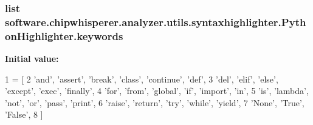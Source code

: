 \subsubsection[{keywords}]{\setlength{\rightskip}{0pt plus 5cm}list software.\+chipwhisperer.\+analyzer.\+utils.\+syntaxhighlighter.\+Python\+Highlighter.\+keywords\hspace{0.3cm}{\ttfamily [static]}}\label{classsoftware_1_1chipwhisperer_1_1analyzer_1_1utils_1_1syntaxhighlighter_1_1PythonHighlighter_ad5fa814a6a65820676451524e140fdcd}
{\bfseries Initial value\+:}
\begin{DoxyCode}
1 = [
2         \textcolor{stringliteral}{'and'}, \textcolor{stringliteral}{'assert'}, \textcolor{stringliteral}{'break'}, \textcolor{stringliteral}{'class'}, \textcolor{stringliteral}{'continue'}, \textcolor{stringliteral}{'def'},
3         \textcolor{stringliteral}{'del'}, \textcolor{stringliteral}{'elif'}, \textcolor{stringliteral}{'else'}, \textcolor{stringliteral}{'except'}, \textcolor{stringliteral}{'exec'}, \textcolor{stringliteral}{'finally'},
4         \textcolor{stringliteral}{'for'}, \textcolor{stringliteral}{'from'}, \textcolor{stringliteral}{'global'}, \textcolor{stringliteral}{'if'}, \textcolor{stringliteral}{'import'}, \textcolor{stringliteral}{'in'},
5         \textcolor{stringliteral}{'is'}, \textcolor{stringliteral}{'lambda'}, \textcolor{stringliteral}{'not'}, \textcolor{stringliteral}{'or'}, \textcolor{stringliteral}{'pass'}, \textcolor{stringliteral}{'print'},
6         \textcolor{stringliteral}{'raise'}, \textcolor{stringliteral}{'return'}, \textcolor{stringliteral}{'try'}, \textcolor{stringliteral}{'while'}, \textcolor{stringliteral}{'yield'},
7         \textcolor{stringliteral}{'None'}, \textcolor{stringliteral}{'True'}, \textcolor{stringliteral}{'False'},
8     ]
\end{DoxyCode}
\hypertarget{classsoftware_1_1chipwhisperer_1_1analyzer_1_1utils_1_1syntaxhighlighter_1_1PythonHighlighter_af01544c219b1f3b65d672c4f992c0b0f}{}
